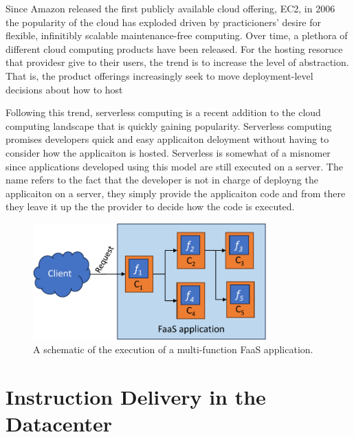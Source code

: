 \documentclass[../main.tex]{subfiles}
\begin{document}
\begin{refsection}
Since Amazon released the first publicly available cloud offering, EC2, in 2006~\cite{qian2009cloud} the popularity of the cloud has exploded driven by practicioners' desire for flexible, infinitibly scalable maintenance-free computing. Over time, a plethora of different cloud computing products have been released. For the hosting resoruce that providesr give to their users, the trend is to increase the level of abstraction. That is, the product offerings increasingly seek to move deployment-level decisions about how to host

Following this trend, serverless computing is a recent addition to the cloud computing landscape that is quickly gaining popularity. Serverless computing promises developers quick and easy applicaiton deloyment without having to consider how the applicaiton is hosted. Serverless is somewhat of a misnomer since applications developed using this model are still executed on a server. The name refers to the fact that the developer is not in charge of deployng the applicaiton on a server, they simply provide the applicaiton code and from there they leave it up the the provider to decide how the code is executed. 




\begin{figure}[ht]
  \centering
\includegraphics[width=0.8\textwidth]{papers/paper5-cofaas/figures/faas_application.pdf}
\caption{\label{fig:faas-app} A schematic of the execution of a multi-function FaaS application.}
\end{figure}

\section{Instruction Delivery in the Datacenter}
\label{sec:instr-delivery}


\end{refsection}
\end{document}
